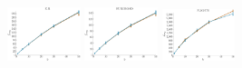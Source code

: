 \documentclass[a4paper]{report}
\newcommand{\wratio}{0.16}
\begin{document}
\includegraphics[width=\wratio\textwidth]{maxcut/E_R/fs_e_r}\hfill
\includegraphics[width=\wratio\textwidth]{maxcut/EUROROAD/fs_euroroad}\hfill
\includegraphics[width=\wratio\textwidth]{maxcut/FLIGHTS/fs_flights}\hfill
\end{document}
